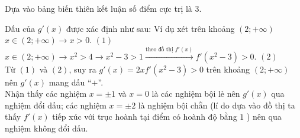 \begin{ex}
{\begin{center}
\end{center}
Dựa vào bảng biến thiên kết luận số điểm cực trị là $3$.\\
\begin{note}
Dấu của $g'(x)$ được xác định như sau: Ví dụ xét trên khoảng $(2;+\infty)$ \\
$x\in (2;+\infty)\to x>0$. $(1)$ \\
$x\in (2;+\infty)\to x^2>4\xrightarrow{}x^2-3>1\xrightarrow{\text{theo đồ thị}\,\, f'(x)}f'(x^2-3)>0$. $(2)$ \\
Từ $(1)$ và $(2)$, suy ra $g'(x)=2xf'(x^2-3)>0$ trên khoảng $(2;+\infty)$ nên $g'(x)$ mang dấu ``$+$''.\\
Nhận thấy các nghiệm $x=\pm 1$ và $x=0$ là các nghiệm bội lẻ nên $g'(x)$ qua nghiệm đổi dấu; các nghiệm $x=\pm 2$ là nghiệm bội chẵn (lí do dựa vào đồ thị ta thấy $f'(x)$ tiếp xúc với trục hoành tại điểm có hoành độ bằng $1$ ) nên qua nghiệm không đổi dấu.	
\end{note}
}
\end{ex}
